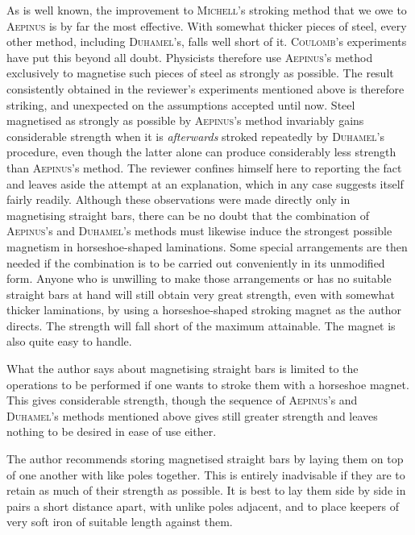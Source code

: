 As is well known, the improvement to \textsc{Michell}’s stroking method that we owe to \textsc{Aepinus} is by far the most effective. With somewhat thicker pieces of steel, every other method, including \textsc{Duhamel}’s, falls well short of it. \textsc{Coulomb}’s experiments have put this beyond all doubt. Physicists therefore use \textsc{Aepinus}’s method exclusively to magnetise such pieces of steel as strongly as possible. The result consistently obtained in the reviewer’s experiments mentioned above is therefore striking, and unexpected on the assumptions accepted until now. Steel magnetised as strongly as possible by \textsc{Aepinus}’s method invariably gains considerable strength when it is \textit{afterwards} stroked repeatedly by \textsc{Duhamel}’s procedure, even though the latter alone can produce considerably less strength than \textsc{Aepinus}’s method. The reviewer confines himself here to reporting the fact and leaves aside the attempt at an explanation, which in any case suggests itself fairly readily. Although these observations were made directly only in magnetising straight bars, there can be no doubt that the combination of \textsc{Aepinus}’s and \textsc{Duhamel}’s methods must likewise induce the strongest possible magnetism in horseshoe-shaped laminations. Some special arrangements are then needed if the combination is to be carried out conveniently in its unmodified form. Anyone who is unwilling to make those arrangements or has no suitable straight bars at hand will still obtain very great strength, even with somewhat thicker laminations, by using a horseshoe-shaped stroking magnet as the author directs. The strength will fall short of the maximum attainable. The magnet is also quite easy to handle.

What the author says about magnetising straight bars is limited to the operations to be performed if one wants to stroke them with a horseshoe magnet. This gives considerable strength, though the sequence of \textsc{Aepinus}’s and \textsc{Duhamel}’s methods mentioned above gives still greater strength and leaves nothing to be desired in ease of use either.

The author recommends storing magnetised straight bars by laying them on top of one another with like poles together. This is entirely inadvisable if they are to retain as much of their strength as possible. It is best to lay them side by side in pairs a short distance apart, with unlike poles adjacent, and to place keepers of very soft iron of suitable length against them.

